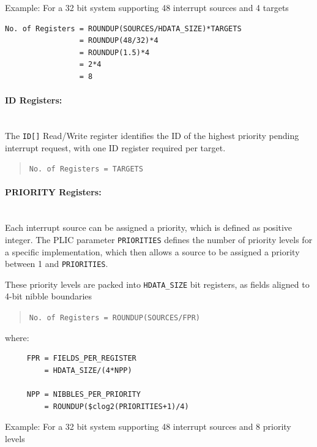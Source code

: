 Example: For a 32 bit system supporting 48 interrupt sources and 4 targets

\begin{verbatim}
No. of Registers = ROUNDUP(SOURCES/HDATA_SIZE)*TARGETS
                 = ROUNDUP(48/32)*4
                 = ROUNDUP(1.5)*4
                 = 2*4
                 = 8
\end{verbatim}

\paragraph{ID Registers:} ~\\

The \texttt{ID[]} Read/Write register identifies the ID of the highest priority pending interrupt request, with one ID register required per target.

\begin{quote}
\texttt{No.\ of\ Registers\ =\ TARGETS}
\end{quote}

\paragraph{PRIORITY Registers:} ~\\

Each interrupt source can be assigned a priority, which is defined as positive integer.
The PLIC parameter \texttt{PRIORITIES} defines the number of priority levels for a specific implementation, which then
allows a source to be assigned a priority between 1 and \texttt{PRIORITIES}.

These priority levels are packed into \texttt{HDATA\_SIZE} bit registers, as fields aligned to 4-bit nibble boundaries

\begin{quote}
	\texttt{No.\ of\ Registers\ =\ ROUNDUP(SOURCES/FPR)}
\end{quote}
where:
\indent
\begin{verbatim}
     FPR = FIELDS_PER_REGISTER    
         = HDATA_SIZE/(4*NPP)

     NPP = NIBBLES_PER_PRIORITY
         = ROUNDUP($clog2(PRIORITIES+1)/4)
\end{verbatim}

Example: For a 32 bit system supporting 48 interrupt sources and 8 priority levels

